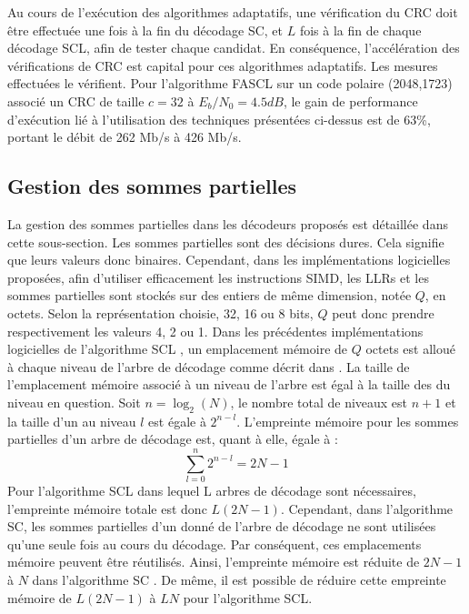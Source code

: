 Au cours de l'exécution des algorithmes adaptatifs, une vérification du CRC doit être effectuée une fois à la fin du décodage SC, et $L$ fois à la fin de chaque décodage SCL, afin de tester chaque candidat. En conséquence, l'accélération des vérifications de CRC est capital pour ces algorithmes adaptatifs.
Les mesures effectuées le vérifient. Pour l'algorithme FASCL sur un code polaire (2048,1723) associé un CRC de taille $c=32$ à $E_b/N_0 = 4.5dB$, le gain de performance d'exécution lié à l'utilisation des techniques présentées ci-dessus est de 63\%, portant le débit de 262 Mb/s à 426 Mb/s.

\subsection{Gestion des sommes partielles}
La gestion des sommes partielles dans les décodeurs proposés est détaillée dans cette sous-section.
Les sommes partielles sont des décisions dures. Cela signifie que leurs valeurs donc binaires. Cependant, dans les implémentations logicielles proposées, afin d'utiliser efficacement les instructions SIMD, les LLRs et les sommes partielles sont stockés sur des entiers de même dimension, notée $Q$, en octets. Selon la représentation choisie, 32, 16 ou 8 bits, $Q$ peut donc prendre respectivement les valeurs 4, 2 ou 1. 
Dans les précédentes implémentations logicielles de l'algorithme SCL \cite{sarkis_fast_2016,sarkis_increasing_2014,shen_low-latency_2016}, un emplacement mémoire de $Q$ octets est alloué à chaque niveau de l'arbre de décodage comme décrit dans \cite{tal_list_2011}. La taille de l'emplacement mémoire associé à un niveau de l'arbre est égal à la taille des \noeuds du niveau en question. Soit $n=\log_2(N)$, le nombre total de niveaux est $n+1$ et la taille d'un \noeud au niveau $l$ est égale à $2^{n-l}$. L'empreinte mémoire pour les sommes partielles d'un arbre de décodage est, quant à elle, égale à : 
\begin{equation}
\sum^n_{l=0}2^{n-l}=2N-1
\end{equation}
Pour l'algorithme SCL dans lequel L arbres de décodage sont nécessaires, l'empreinte mémoire totale est donc $L(2N-1)$. Cependant, dans l'algorithme SC, les sommes partielles d'un \noeud donné de l'arbre de décodage ne sont utilisées qu'une seule fois au cours du décodage. Par conséquent, ces emplacements mémoire peuvent être réutilisés. Ainsi, l'empreinte mémoire est réduite de $2N-1$ à $N$ dans l'algorithme SC \cite{leroux_hardware_2011}. De même, il est possible de réduire cette empreinte mémoire de $L(2N-1)$ à $LN$ pour l'algorithme SCL.

